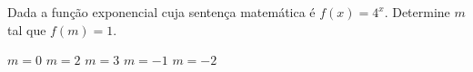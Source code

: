 Dada a função exponencial cuja sentença matemática é $f(x)=4^x$. Determine $m$ tal que $f(m)=1$.

$m=0$
$m=2$
$m=3$
$m=-1$
$m=-2$


